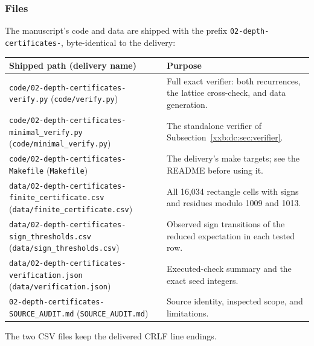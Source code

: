 \documentclass[11pt,a4paper]{article}
\numberwithin{equation}{section}
\theoremstyle{definition}
\theoremstyle{remark}
\theoremstyle{plain}
\begin{document}
\subsubsection{Files}
The manuscript's code and data are shipped with the prefix
\texttt{02-depth-\allowbreak certificates-\allowbreak }, byte-identical to the delivery:
\begin{longtable}{@{}>{\raggedright\arraybackslash}p{}>{\raggedright\arraybackslash}p{}@{}}
\toprule
Shipped path (delivery name) & Purpose\\
\midrule
\endhead
\texttt{code/02-depth-\allowbreak certificates-\allowbreak verify.py} (\texttt{code/verify.py}) & Full exact verifier: both recurrences, the lattice cross-check, and data generation.\\
\texttt{code/02-depth-\allowbreak certificates-\allowbreak minimal\_verify.py} (\texttt{code/minimal\_verify.py}) & The standalone verifier of Subsection~\ref{xxb:dc:sec:verifier}.\\
\texttt{code/02-depth-\allowbreak certificates-\allowbreak Makefile} (\texttt{Makefile}) & The delivery's make targets; see the README before using it.\\
\texttt{data/02-depth-\allowbreak certificates-\allowbreak finite\_certificate.csv} (\texttt{data/finite\_certificate.csv}) & All 16,034 rectangle cells with signs and residues modulo 1009 and 1013.\\
\texttt{data/02-depth-\allowbreak certificates-\allowbreak sign\_thresholds.csv} (\texttt{data/sign\_thresholds.csv}) & Observed sign transitions of the reduced expectation in each tested row.\\
\texttt{data/02-depth-\allowbreak certificates-\allowbreak verification.json} (\texttt{data/verification.json}) & Executed-check summary and the exact seed integers.\\
\texttt{02-depth-\allowbreak certificates-\allowbreak SOURCE\_AUDIT.md} (\texttt{SOURCE\_AUDIT.md}) & Source identity, inspected scope, and limitations.\\
\bottomrule
\end{longtable}
The two CSV files keep the delivered CRLF line endings.
\end{document}
